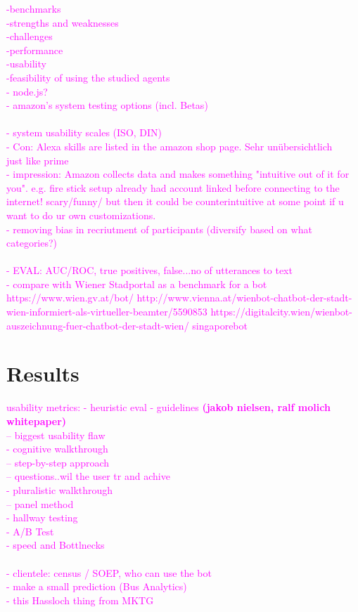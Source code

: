 \textcolor{magenta}{
-benchmarks\\
-strengths and weaknesses\\
-challenges\\
-performance\\
-usability\\
-feasibility of using the studied agents
\\
- node.js?\\
- amazon's system testing options (incl. Betas)\\
\\
- system usability scales (ISO, DIN)\\
- Con: Alexa skills are listed in the amazon shop page. Sehr un\"ubersichtlich\\ just like prime\\
- impression: Amazon collects data and makes something "intuitive out of it for you". e.g. fire stick setup already had account linked before connecting to the internet! scary/funny/ but then it could be counterintuitive at some point if u want to do ur own customizations.
\\
- removing bias in recriutment of participants (diversify based on what categories?)\\
\\
- EVAL: AUC/ROC, true positives, false...no of utterances to text\\
- compare with Wiener Stadportal as a benchmark for a bot\\
https://www.wien.gv.at/bot/
http://www.vienna.at/wienbot-chatbot-der-stadt-wien-informiert-als-virtueller-beamter/5590853
https://digitalcity.wien/wienbot-auszeichnung-fuer-chatbot-der-stadt-wien/
singaporebot
}

\section{Results}
\label{results}
\textcolor{magenta}{
usability metrics:
- heuristic eval - guidelines \textbf{(jakob nielsen, ralf molich whitepaper)}\\
-- biggest usability flaw\\
- cognitive walkthrough\\
-- step-by-step approach\\
-- questions..wil the user tr and achive\\
- pluralistic walkthrough\\
-- panel method\\
- hallway testing\\
- A/B Test\\
- speed and Bottlnecks\\
\\
- clientele: census / SOEP, who can use the bot\\
- make a small prediction (Bus Analytics)\\
- this Hassloch thing from MKTG\\
}

